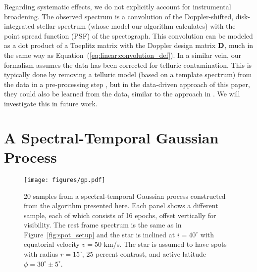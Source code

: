 \documentclass[modern]{aastex631}
\begin{document}
Regarding systematic effects, we do not explicitly account for instrumental broadening. 
The observed spectrum is a convolution of the Doppler-shifted, disk-integrated stellar spectrum (whose model our algorithm calculates) with the point spread function (PSF) of the spectograph.
This convolution can be modeled as a dot product of a Toeplitz matrix with the Doppler design matrix ${\mathbf{D}}$, much in the same way as Equation~(\ref{eq:linear:convolution_def}).
In a similar vein, our formalism assumes the data has been corrected for telluric contamination. 
This is typically done by removing a telluric model (based on a template spectrum) from the data in a pre-processing step \citep[as in][]{Crossfield2014}, but in the data-driven approach of this paper, they could also be learned from the data, similar to the approach in \citet{Bedell2019}.
We will investigate this in future work.

\section{A Spectral-Temporal Gaussian Process}
\label{sec:gp}

%
\begin{figure}[t!]
    \begin{centering}
        \texttt{[image: figures/gp.pdf]}
        \caption{%
            20 samples from a spectral-temporal Gaussian process constructed from the algorithm presented here.
            Each panel shows a different sample, each of which consists of 16 epochs, offset vertically for visibility.
            The rest frame spectrum is the same as in Figure~\ref{fig:spot_setup} and the star is inclined at $i = 40^\circ$ with equatorial velocity $v = 50$ km/s.
            The star is assumed to have spots with radius $r = 15^\circ$, 25 percent contrast, and active latitude $\phi = 30^\circ \pm 5^\circ$.
        }
        \label{fig:gp}
    \end{centering}
\end{figure}
%
\end{document}
